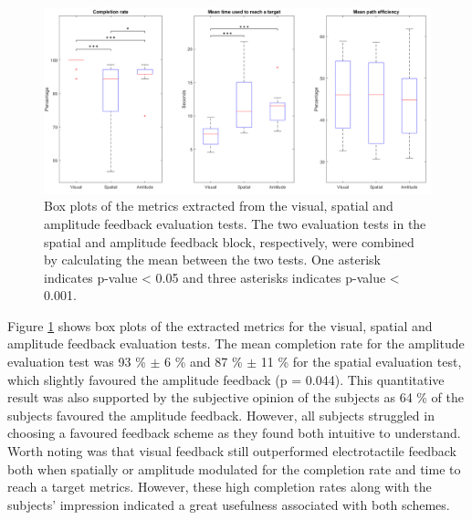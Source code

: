 \begin{figure}[h]                 
	\includegraphics[width=1\textwidth]{figures/boxplot_results}
	\caption{Box plots of the metrics extracted from the visual, spatial and amplitude feedback evaluation tests. The two evaluation tests in the spatial and amplitude feedback block, respectively, were combined by calculating the mean between the two tests. One asterisk indicates p-value < 0.05 and three asterisks indicates p-value < 0.001.}
	\label{fig:pa:boxplot_results} 
\end{figure}
Figure \ref{fig:pa:boxplot_results} shows box plots of the extracted metrics for the visual, spatial and amplitude feedback evaluation tests. The mean completion rate for the amplitude evaluation test was 93 \% $\pm$ 6 \% and 87 \% $\pm$ 11 \% for the spatial evaluation test, which slightly favoured the amplitude feedback (p = 0.044). This quantitative result was also supported by the subjective opinion of the subjects as 64 \% of the subjects favoured the amplitude feedback. However, all subjects struggled in choosing a favoured feedback scheme as they found both intuitive to understand. Worth noting was that visual feedback still outperformed electrotactile feedback both when spatially or amplitude modulated for the completion rate and time to reach a target metrics. However, these high completion rates along with the subjects' impression indicated a great usefulness associated with both schemes.  
